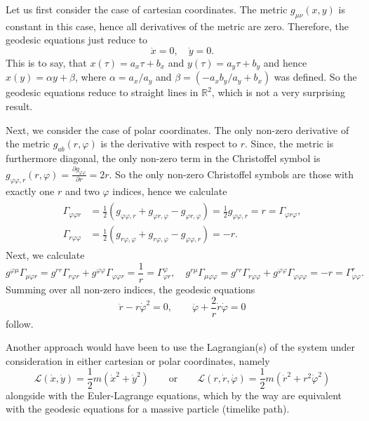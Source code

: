 \documentclass[a4paper,11pt]{article}
\numberwithin{equation}{section}
\begin{document}
{Let us first consider the case of cartesian coordinates. The metric $g_{\mu\nu}(x,y)$ is constant in this case, hence all derivatives of the metric are zero. Therefore, the geodesic equations just reduce to \begin{equation}
\ddot{x} = 0, \quad \ddot{y} = 0.
\end{equation} This is to say, that $x(\tau) = a_x\tau + b_x$ and $y(\tau) = a_y \tau + b_y$ and hence $x(y) = \alpha y + \beta$, where $\alpha = a_x/a_y$ and $\beta = (-a_xb_y/a_y + b_x)$ was defined. So the geodesic equations reduce to straight lines in $\mathbb{R}^2$, which is not a very surprising result.

Next, we consider the case of polar coordinates. The only non-zero derivative of the metric $g_{ab}(r,\varphi)$ is the derivative with respect to $r$. Since, the metric is furthermore diagonal, the only non-zero term in the Christoffel symbol is $g_{\varphi\varphi,r}(r,\varphi) = \frac{\partial g_{\varphi\varphi}}{\partial r} = 2r$. So the only non-zero Christoffel symbols are those with exactly one $r$ and two $\varphi$ indices, hence we calculate \begin{align}
\begin{aligned}
\Gamma_{\varphi\varphi r} &= \frac{1}{2}\left(g_{\varphi \varphi,r} + g_{\varphi r, \varphi}-g_{\varphi r, \varphi}\right) = \frac{1}{2}g_{\varphi\varphi,r} = r = \Gamma_{\varphi r \varphi}, \\
\Gamma_{r\varphi\varphi} &= \frac{1}{2}\left(g_{r\varphi,\varphi}+g_{r\varphi,\varphi}-g_{\varphi\varphi,r}\right) = -r.
\end{aligned}
\end{align} Next, we calculate \begin{equation} g^{\varphi \mu}\Gamma_{\mu\varphi r} = g^{rr}\Gamma_{r\varphi r} + g^{\varphi\varphi}\Gamma_{\varphi\varphi r} = \frac{1}{r} = \Gamma^{\varphi}_{\varphi r}, \quad  g^{r\mu}\Gamma_{\mu\varphi\varphi} = g^{rr}\Gamma_{r\varphi\varphi} + g^{\varphi\varphi}\Gamma_{\varphi\varphi\varphi} = -r = \Gamma^{r}_{\varphi\varphi}. 
\end{equation} Summing over all non-zero indices, the geodesic equations \begin{equation}
\ddot{r} - r\dot{\varphi}^2 = 0, \qquad \ddot{\varphi} + \frac{2}{r}\dot{r}\dot{\varphi} = 0
\end{equation} follow.

Another approach would have been to use the Lagrangian(s) of the system under consideration in either cartesian or polar coordinates, namely \begin{equation}
\mathcal{L}(\dot{x},\dot{y})=\frac{1}{2}m(\dot{x}^2+\dot{y}^2) \qquad \text{or} \qquad \mathcal{L}(r,\dot{r},\dot{\varphi}) = \frac{1}{2}m(\dot{r}^2+r^2\dot{\varphi}^2)
\end{equation} alongside with the Euler-Lagrange equations, which by the way are equivalent with the geodesic equations for a massive particle (timelike path).
}
\end{document}
